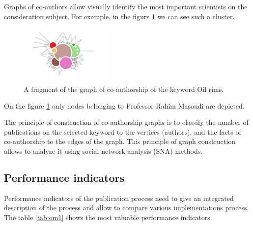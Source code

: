 \documentclass[12pt]{report}
\theoremstyle{definition}
\begin{document}
Graphs of co-authors allow visually identify the most important scientists on the consideration subject.
For example, in the figure \ref{fig:om4} we can see such a cluster.

\begin{figure}[ht]
	\centering
	\includegraphics[width=0.40\textwidth]{om4}
	\caption{A fragment of the graph of co-authorship of the keyword Oil rims.}
	\label{fig:om4}
\end{figure} 

On the figure \ref{fig:om4} only nodes belonging to Professor Rahim Masoudi are depicted.

The principle of construction of co-authorship graphs is to classify the number of publications on the selected keyword to the vertices (authors), and the facts of co-authorship to the edges of the graph. 
This principle of graph construction allows to analyze it using social network analysis (SNA) methods.

\subsection{Performance indicators}
Performance indicators of the publication process need to give an integrated description of the process and allow to compare various implementations process. 
The table \ref{tab:om1} shows the most valuable  performance indicators.

\begin{table}[H]
	\centering
	\caption{Performance indicators of the publishing process.}
	\label{tab:om1}
\end{table}
\end{document}

